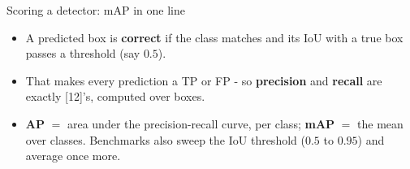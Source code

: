 \documentclass[aspectratio=169]{beamer}
\begin{document}
\begin{frame}{Scoring a detector: mAP in one line}
  \begin{itemize}
    \item A predicted box is \textbf{correct} if the class matches and its IoU with a
      true box passes a threshold (say $0.5$).
    \item That makes every prediction a TP or FP - so \textbf{precision} and
      \textbf{recall} are exactly [12]'s, computed over boxes.
    \item \textbf{AP} $=$ area under the precision-recall curve, per class;
      \textbf{mAP} $=$ the mean over classes. Benchmarks also sweep the IoU threshold
      ($0.5$ to $0.95$) and average once more.
  \end{itemize}
  \vskip 8pt
\end{frame}
\end{document}
